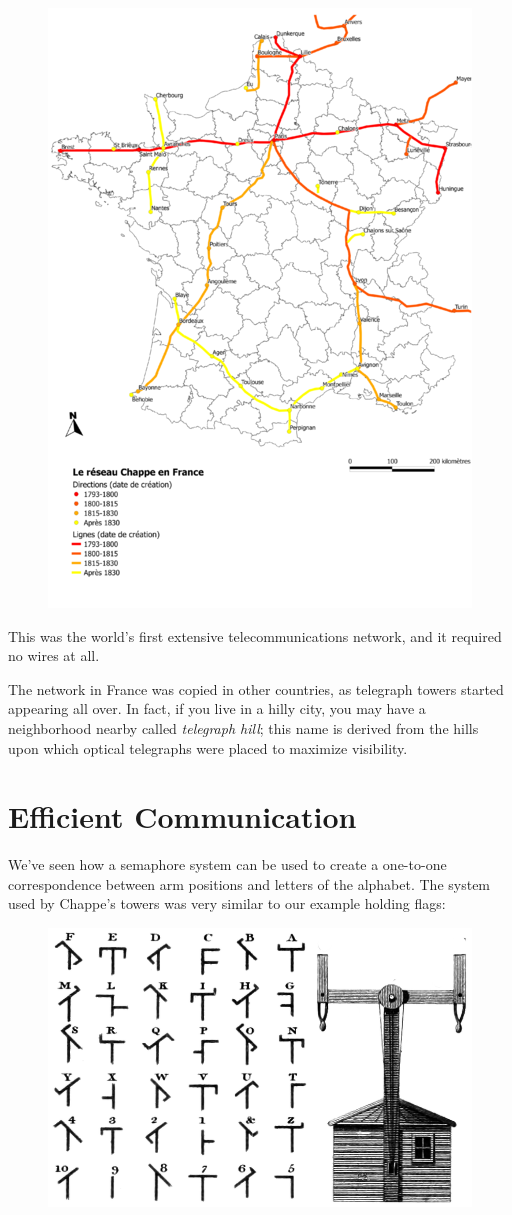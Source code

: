 \documentclass[UTF8]{book}
\begin{document}
\begin{CJK}{UTF8}{gbsn}
\begin{figure}[H]
\centering
\includegraphics[width=0.5\linewidth]{chappe_network}
\end{figure}

This was the world's first extensive telecommunications network, and it required no wires at all.

The network in France was copied in other countries, as telegraph towers started appearing all over. In fact, if you live in a hilly city, you may have a neighborhood nearby called \emph{telegraph hill}; this name is derived from the hills upon which optical telegraphs were placed to maximize visibility.

\section*{Efficient Communication}

We've seen how a semaphore system can be used to create a one-to-one correspondence between arm positions and letters of the alphabet. The system used by Chappe's towers was very similar to our example holding flags:

\begin{figure}[H]
\centering
\includegraphics[width=0.5\linewidth]{chappe_telegraph_system}
\end{figure}


\end{CJK}
\end{document}
